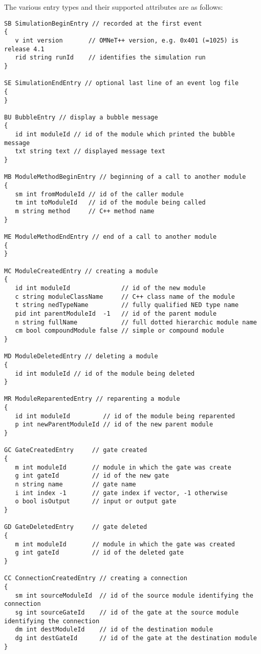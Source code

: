 The various entry types and their supported attributes are as follows:

\begin{verbatim}
SB SimulationBeginEntry // recorded at the first event
{
   v int version       // OMNeT++ version, e.g. 0x401 (=1025) is release 4.1
   rid string runId    // identifies the simulation run
}

SE SimulationEndEntry // optional last line of an event log file
{
}

BU BubbleEntry // display a bubble message
{
   id int moduleId // id of the module which printed the bubble message
   txt string text // displayed message text
}

MB ModuleMethodBeginEntry // beginning of a call to another module
{
   sm int fromModuleId // id of the caller module
   tm int toModuleId   // id of the module being called
   m string method     // C++ method name
}

ME ModuleMethodEndEntry // end of a call to another module
{
}

MC ModuleCreatedEntry // creating a module
{
   id int moduleId              // id of the new module
   c string moduleClassName     // C++ class name of the module
   t string nedTypeName         // fully qualified NED type name
   pid int parentModuleId  -1   // id of the parent module
   n string fullName            // full dotted hierarchic module name
   cm bool compoundModule false // simple or compound module
}

MD ModuleDeletedEntry // deleting a module
{
   id int moduleId // id of the module being deleted
}

MR ModuleReparentedEntry // reparenting a module
{
   id int moduleId         // id of the module being reparented
   p int newParentModuleId // id of the new parent module
}

GC GateCreatedEntry     // gate created
{
   m int moduleId       // module in which the gate was create
   g int gateId         // id of the new gate
   n string name        // gate name
   i int index -1       // gate index if vector, -1 otherwise
   o bool isOutput      // input or output gate
}

GD GateDeletedEntry     // gate deleted
{
   m int moduleId       // module in which the gate was created
   g int gateId         // id of the deleted gate
}

CC ConnectionCreatedEntry // creating a connection
{
   sm int sourceModuleId  // id of the source module identifying the connection
   sg int sourceGateId    // id of the gate at the source module identifying the connection
   dm int destModuleId    // id of the destination module
   dg int destGateId      // id of the gate at the destination module
}


\end{verbatim}
